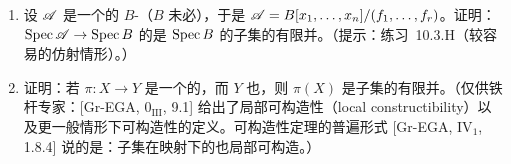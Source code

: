 \begin{exercise}\label{ex:chevalley-locally-finitely-presented}
\begin{enumerate}[label=(\alph*)]
  \item 设 $\mathscr{A}$ 是一个\trFinitelyPresented{}的 $B$-\trAlgebra（$B$ 未必\trNoetherian），于是 $\mathscr{A}=B[x_1,\dots,x_n]/(f_1,\dots,f_r)$。证明：$\operatorname{Spec}\mathscr{A}\to\operatorname{Spec} B$ 的\trImage{}是 $\operatorname{Spec} B$ 的\trLocally\trClosed{}子集的有限并。（提示：\mbox{练习~10.3.H}（较容易的仿射情形）。）
  \item 证明：若 $\pi\colon X\to Y$ 是一个\trQuasicompact{}的\trLocally\trFinitelyPresented\trMorphism，而 $Y$ 也\trQuasicompact，则 $\pi(X)$ 是\trLocally\trClosed{}子集的有限并。（仅供铁杆专家：[Gr-EGA, 0$_{\mathrm{III}}$, 9.1] 给出了局部可构造性（local constructibility）以及更一般情形下可构造性的定义。\trChevalley{}可构造性定理的普遍形式 [Gr-EGA, IV$_1$, 1.8.4] 说的是：\trLocally\trConstructible{}子集在\trFinitelyPresented{}映射下的\trImage{}也局部可构造。）
\end{enumerate}
\end{exercise}
